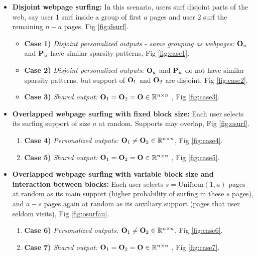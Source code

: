 	\begin{itemize}
		\item {\bf Disjoint webpage surfing:}  In this scenario, users surf disjoint parts of the web, say user 1 surf inside a group of first $a$ pages and user 2 surf the remaining $n - a$ pages, Fig \ref{fig:dsurf}.
		\begin{itemize}
			\item[] {\bf Case 1)} \emph{Disjoint personalized outputs - same grouping as webpages:} $\O_u$ and $\P_u$ have similar sparsity patterns, Fig \ref{fig:case1}. 
			\item[] {\bf Case 2)} \emph{Disjoint personalized outputs:} $\O_u$ and $\P_u$ do not have similar sparsity patterns, but support of $\O_1$ and $\O_2$ are disjoint, Fig \ref{fig:case2}. 
			\item[] {\bf Case 3)} \emph{Shared output:} $\O_1 = \O_2 = \O \in \reals^{n \times n}$ , Fig \ref{fig:case3}.
		\end{itemize}
		\item {\bf Overlapped webpage surfing with fixed block size: }
		Each user selects its surfing support of size $a$ at random. 
		Supports may overlap, Fig \ref{fig:osurf}. 
		\begin{enumerate}
			\item[] {\bf Case 4)} \emph{Personalized outputs:} $\O_1 \neq \O_2 \in \reals^{n \times n}$, Fig \ref{fig:case4}. 
			\item[] {\bf Case 5)} \emph{Shared output:} $\O_1 = \O_2 = \O \in \reals^{n \times n}$ , Fig \ref{fig:case5}.
		\end{enumerate}
		\item {\bf Overlapped webpage surfing with variable block size and interaction between blocks: }
		Each user selects $s = \text{Uniform}(1, a)$ pages at random as its main support (higher probability of surfing in these $s$ pages), and $a-s$ pages again at random as its auxiliary support (pages that user seldom visits), Fig \ref{fig:osurfau}.
		\begin{enumerate}
			\item[] {\bf Case 6)} \emph{Personalized outputs:} $\O_1 \neq \O_2 \in \reals^{n \times n}$, Fig \ref{fig:case6}. 
			\item[] {\bf Case 7)} \emph{Shared output:} $\O_1 = \O_2 = \O \in \reals^{n \times n}$ , Fig \ref{fig:case7}.
		\end{enumerate}
	\end{itemize}
	
